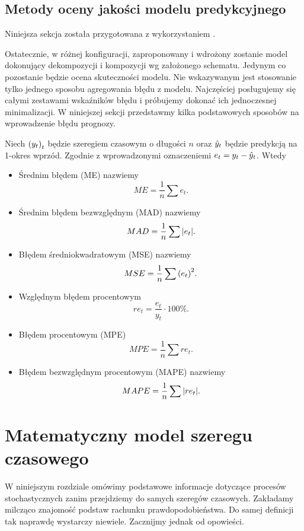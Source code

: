 \documentclass[10pt,a4paper]{book}
\begin{document}
\section{Metody oceny jakości modelu predykcyjnego}

Niniejsza sekcja została przygotowana z wykorzystaniem \citep{montgomery2015introduction}.

Ostatecznie, w różnej konfiguracji, zaproponowany i wdrożony zostanie model dokonujący dekompozycji i kompozycji wg założonego schematu. Jedynym co pozostanie będzie ocena skuteczności modelu. Nie wskazywanym jest stosowanie tylko jednego sposobu agregowania błędu z modelu. Najczęściej posługujemy się całymi zestawami wskaźników błędu i próbujemy dokonać ich jednoczesnej minimalizacji. W niniejszej sekcji przedstawmy kilka podstawowych sposobów na wprowadzenie błędu prognozy.

\begin{definition}
Niech $\left( {y_t} \right)_{t}^{} $ będzie szeregiem czasowym  o długości $n$ oraz $\predict{y}{t}$ będzie predykcją na 1-okres wprzód. Zgodnie z wprowadzonymi oznaczeniemi $e_t = y_t - \predict{y}{t}$. Wtedy
\begin{itemize}
\item Średnim błędem (ME) nazwiemy 
$$
ME = \frac{1}{n} \sum  e_t.
$$
\item Średnim błędem bezwzględnym (MAD) nazwiemy 
$$
MAD = \frac{1}{n} \sum  \abs{e_t}.
$$
\item Błędem średniokwadratowym (MSE) nazwiemy 
$$
MSE = \frac{1}{n} \sum  \bracket{e_t}^2.
$$
\item Względnym błędem procentowym 
$$
re_t = \frac{e_t}{y_t} \cdot 100 \%.
$$
\item Błędem procentowym (MPE) 
$$
MPE = \frac{1}{n} \sum  re_t.
$$
\item Błędem bezwzględnym procentowym (MAPE) nazwiemy 
$$
MAPE = \frac{1}{n} \sum  \abs{re_t} .
$$
\end{itemize}
\end{definition}

\chapter{Matematyczny model szeregu czasowego}

W niniejszym rozdziale omówimy podstawowe informacje dotyczące procesów stochastycznych zanim przejdziemy do samych szeregów czasowych. Zakładamy milcząco znajomość podstaw rachunku prawdopodobieństwa. Do samej definicji tak naprawdę wystarczy niewiele. Zacznijmy jednak od opowieści.
\end{document}

